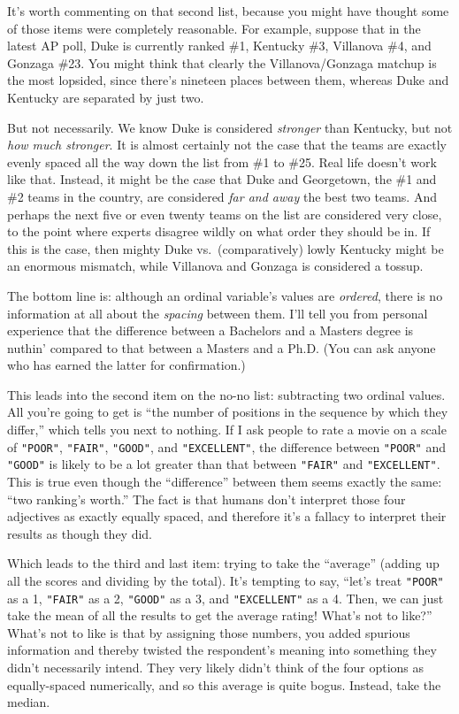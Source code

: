 It's worth commenting on that second list, because you might have thought some
of those items were completely reasonable. For example, suppose that in the
latest AP poll, Duke is currently ranked \#1, Kentucky \#3, Villanova \#4, and
Gonzaga \#23. You might think that clearly the Villanova/Gonzaga matchup is the
most lopsided, since there's nineteen places between them, whereas Duke and
Kentucky are separated by just two.

But not necessarily. We know Duke is considered \textit{stronger} than
Kentucky, but not \textit{how much stronger}. It is almost certainly not the
case that the teams are exactly evenly spaced all the way down the list from
\#1 to \#25. Real life doesn't work like that. Instead, it might be the case
that Duke and Georgetown, the \#1 and \#2 teams in the country, are considered
\textit{far and away} the best two teams. And perhaps the next five or even
twenty teams on the list are considered very close, to the point where experts
disagree wildly on what order they should be in. If this is the case, then
mighty Duke vs.~(comparatively) lowly Kentucky might be an enormous mismatch,
while Villanova and Gonzaga is considered a tossup.

The bottom line is: although an ordinal variable's values are \textit{ordered},
there is no information at all about the \textit{spacing} between them. I'll
tell you from personal experience that the difference between a Bachelors and a
Masters degree is nuthin' compared to that between a Masters and a Ph.D. (You
can ask anyone who has earned the latter for confirmation.)

This leads into the second item on the no-no list: subtracting two ordinal
values. All you're going to get is ``the number of positions in the sequence by
which they differ,'' which tells you next to nothing. If I ask people to rate a
movie on a scale of \texttt{"POOR"}, \texttt{"FAIR"}, \texttt{"GOOD"}, and
\texttt{"EXCELLENT"}, the difference between \texttt{"POOR"} and
\texttt{"GOOD"} is likely to be a lot greater than that between \texttt{"FAIR"}
and \texttt{"EXCELLENT"}. This is true even though the ``difference'' between
them seems exactly the same: ``two ranking's worth.'' The fact is that humans
don't interpret those four adjectives as exactly equally spaced, and therefore
it's a fallacy to interpret their results as though they did.

Which leads to the third and last item: trying to take the ``average'' (adding
up all the scores and dividing by the total). It's tempting to say, ``let's
treat \texttt{"POOR"} as a 1, \texttt{"FAIR"} as a 2, \texttt{"GOOD"} as a 3,
and \texttt{"EXCELLENT"} as a 4. Then, we can just take the mean of all the
results to get the average rating! What's not to like?'' What's not to like is
that by assigning those numbers, you added spurious information and thereby
twisted the respondent's meaning into something they didn't necessarily intend.
They very likely didn't think of the four options as equally-spaced
numerically, and so this average is quite bogus. Instead, take the median.


